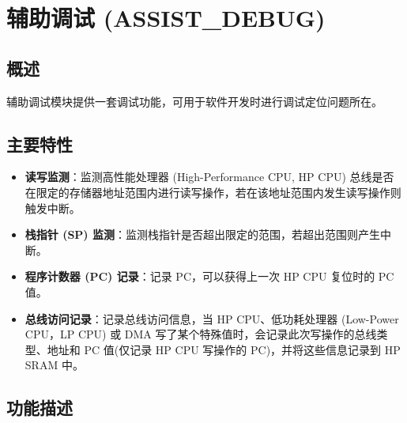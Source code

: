 \documentclass[main\_\_CN.tex]{subfiles}
\begin{document}

\ifglobal
\else
    {\let\clearpage\relax \listoftodos}
    {\let\clearpage\relax \listofdonetodos}
    \tableofcontents
\fi



\chapter{辅助调试 (ASSIST\_DEBUG)}
\label{mod:dbgassist}
\hypertarget{dbgassist}{}


\section{概述}

辅助调试模块提供一套调试功能，可用于软件开发时进行调试定位问题所在。

\section{主要特性}
\label{sec:dbgassist-features}

\begin{itemize}
    \item {\bfseries 读写监测}：监测高性能处理器 (High-Performance CPU, HP CPU) 总线是否在限定的存储器地址范围内进行读写操作，若在该地址范围内发生读写操作则触发中断。
    \item {\bfseries 栈指针 (SP) 监测}：监测栈指针是否超出限定的范围，若超出范围则产生中断。
    \item {\bfseries 程序计数器 (PC) 记录}：记录 PC，可以获得上一次 HP CPU 复位时的 PC 值。
    \item {\bfseries 总线访问记录}：记录总线访问信息，当 HP CPU、低功耗处理器 (Low-Power CPU，LP CPU) 或 DMA 写了某个特殊值时，会记录此次写操作的总线类型、地址和 PC 值(仅记录 HP CPU 写操作的 PC)，并将这些信息记录到 HP SRAM 中。
\end{itemize}


\section{功能描述}
\label{sec:dbgassist-func-descr}
\end{document}
